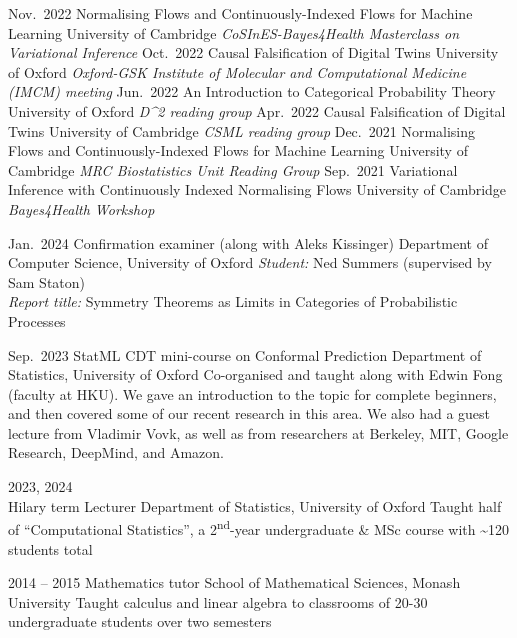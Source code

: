 \documentclass[9pt]{developercv} %
\begin{document}
\begin{entrylist}
    \entry
        {Nov.\ 2022}
        {Normalising Flows and Continuously-Indexed Flows for Machine Learning}
        {University of Cambridge}
        {\textit{CoSInES-Bayes4Health Masterclass on Variational Inference}}
    \entry
        {Oct.\ 2022}
        {Causal Falsification of Digital Twins}
        {University of Oxford}
        {\textit{Oxford-GSK Institute of Molecular and Computational Medicine (IMCM) meeting}}
    \entry
        {Jun.\ 2022}
        {An Introduction to Categorical Probability Theory}
        {University of Oxford}
        {\textit{D\textasciicircum 2 reading group}}
    \entry
        {Apr.\ 2022}
        {Causal Falsification of Digital Twins}
        {University of Cambridge}
        {\textit{CSML reading group}}
    \entry
        {Dec.\ 2021}
        {Normalising Flows and Continuously-Indexed Flows for Machine Learning}
        {University of Cambridge}
        {\textit{MRC Biostatistics Unit Reading Group}}
    \entry
        {Sep.\ 2021}%
        {Variational Inference with Continuously Indexed Normalising Flows}
        {University of Cambridge}
        {\textit{Bayes4Health Workshop}}
\end{entrylist}

\vspace{1em}


\begin{entrylist}
    \entry
        {Jan.\ 2024}
        {Confirmation examiner (along with Aleks Kissinger)}
        {Department of Computer Science, University of Oxford}
        {\emph{Student:} Ned Summers (supervised by Sam Staton) \\
        \emph{Report title:} Symmetry Theorems as Limits in Categories of Probabilistic Processes}

    \entry
        {Sep.\ 2023}
        {StatML CDT mini-course on Conformal Prediction}
        {Department of Statistics, University of Oxford}
        {Co-organised and taught along with Edwin Fong (faculty at HKU). We gave an introduction to the topic for complete beginners, and then covered some of our recent research in this area. We also had a guest lecture from Vladimir Vovk, as well as from researchers at Berkeley, MIT, Google Research, DeepMind, and Amazon.}

    \entry
        {2023, 2024\\\footnotesize{Hilary term}}
        {Lecturer}
        {Department of Statistics, University of Oxford}
        {Taught half of ``Computational Statistics'', a 2\textsuperscript{nd}-year undergraduate \& MSc course with \textasciitilde120 students total}

    \entry
        {2014 -- 2015}%
        {Mathematics tutor}
        {School of Mathematical Sciences, Monash University}
        {Taught calculus and linear algebra to classrooms of 20-30 undergraduate students over two semesters}
\end{entrylist}
\end{document}
